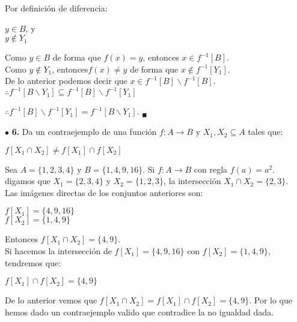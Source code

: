 \documentclass[12pt]{article}
\begin{document}
\begin{enumerate}[label=\alph*)]
    Por definición de diferencia:
    \begin{center}
        $y \in B$, y\\
        $y \notin Y_1$
    \end{center}
    Como $y \in B$ de forma que $f(x) = y$, entonces $x \in f^{-1}[B]$.\\

    Como $y \notin Y_1$, entonces$f(x) \neq y$ de forma que  $x \notin f^{-1}[Y_1]$.\\

    De lo anterior podemos decir que $x \in f^{-1}[B] \backslash f^{-1}[B]$.\\

    $\therefore f^{-1}[B \backslash Y_1] \subseteq f^{-1} [B] \backslash  f^{-1} [Y_1]$

    $\therefore f^{-1} [B] \backslash  f^{-1} [Y_1] = f^{-1}[B \backslash Y_1]$. $_\blacksquare$

\end{enumerate}

\vspace{0.5cm}
%
%
$\bullet$ \textbf{6.} Da un contraejemplo de una función ${\displaystyle f: A \longrightarrow B}$ y $X_1, X_2 \subseteq A$ tales que:
\begin{center}
    ${\displaystyle f} [X_1 \cap X_2] \neq {\displaystyle f}[X_1] \cap {\displaystyle f}[X_2]$
\end{center}
Sea $A = \{1,2,3,4\}$ y $B=\{1,4,9,16\}$. Si $f: A \longrightarrow B$ con regla $f(a) = a^2$.\\

digamos que $X_1 = \{2,3,4\}$ y $X_2 =\{1,2,3\}$, la intersección $X_1 \cap X_2 = \{2,3\}$.\\

Las imágenes directas de los conjuntos anteriores son:
\begin{center}
    $f[X_1] = \{4, 9, 16\}$\\

    $f[X_2] = \{1, 4, 9\}$ 
\end{center}
Entonces $f[X_1 \cap X_2] =\{4, 9\}$.\\

Si hacemos la intersección de $f[X_1] = \{4, 9, 16\}$ con $f[X_2] = \{1, 4, 9\}$, tendremos que:
\begin{center}
    $f[X_1] \cap f[X_2] = \{4, 9\}$\\
\end{center}
De lo anterior vemos que $f[X_1 \cap X_2] = f[X_1] \cap f[X_2] = \{4, 9\}$. Por lo que hemos dado un contraejemplo valido 
que contradice la no igualdad dada.
\end{document}
